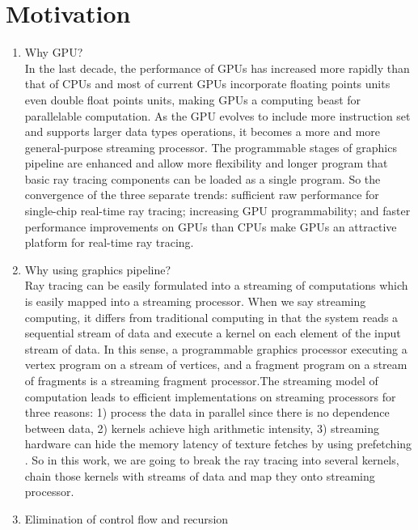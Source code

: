  \section{Motivation}
\begin{enumerate}
    \item Why GPU? \\
    In the last decade, the performance of GPUs has increased more rapidly than that of CPUs and most of current GPUs incorporate floating points units even double float points units, making GPUs a computing beast for parallelable computation. As the GPU evolves to include more instruction set and supports larger data types operations, it becomes a more and more general-purpose streaming processor. The programmable stages of graphics pipeline are enhanced and allow more flexibility and longer program that basic ray tracing components can be loaded as a single program. So the convergence of the three separate trends: sufficient raw performance for single-chip real-time ray tracing; increasing GPU programmability; and faster performance improvements on GPUs than CPUs make GPUs an attractive platform for real-time ray tracing.
    \item Why using graphics pipeline?\\
    Ray tracing can be easily formulated into a streaming of computations which is easily mapped into a streaming processor. When we say streaming computing, it differs from traditional computing in that the system reads a sequential stream of data and execute a kernel on each element of the input stream of data. In this sense, a programmable graphics processor executing a vertex program on a stream of vertices, and a fragment program on a stream of fragments is a streaming fragment processor.The streaming model of computation leads to efficient implementations on streaming processors for three reasons: 1) process the data in parallel since there is no dependence between data, 2) kernels achieve high arithmetic intensity, 3) streaming hardware can hide the memory latency of texture fetches by using prefetching \cite{purcell2002ray}. So in this work, we are going to break the ray tracing into several kernels, chain those kernels with streams of data and map they onto streaming processor.
    \item Elimination of control flow and recursion\\

\end{enumerate}
